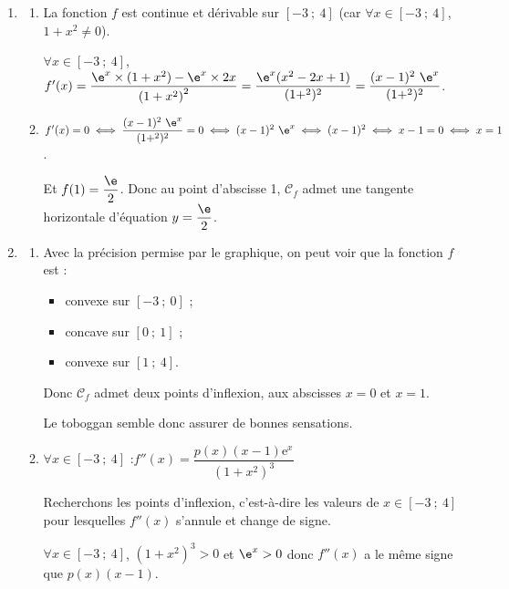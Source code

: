 \begin{enumerate}
	\item 
	\begin{enumerate}
		\item La fonction $f$ est continue et dérivable sur $[-3~;~4]$ (car $\forall x \in [-3~;~4]$, $1+x^2\neq 0$).
		
		$\forall x \in [-3~;~4]$, $f'(x)=\dfrac{\e^x\times (1+x^2)-\e^x\times 2x}{\left(1+x^2\right)^2}=\dfrac{\e^x(x^2-2x+1)}{(1+^2)^2}=\dfrac{(x-1)^2~\e^x}{(1+^2)^2}$.
		\item $f'(x)=0\iff \dfrac{(x-1)^2~\e^x}{(1+^2)^2}=0 \iff (x-1)^2~\e^x \iff (x-1)^2 \iff x-1=0 \iff x=1$.
		
		Et $f(1)=\dfrac{\e}{2}$. Donc au point d'abscisse 1, $\mathcal{C}_f$ admet une tangente horizontale d'équation $y=\dfrac{\e}{2}$.
	\end{enumerate}
	\item
		\begin{enumerate}
			\item Avec la précision permise par le graphique, on peut voir que la fonction $f$ est :
				\begin{itemize}
					\item convexe sur $[-3~;~0]$ ;
					\item concave sur $[0~;~1]$ ;
					\item convexe sur $[1~;~4]$.
				\end{itemize}
		Donc $\mathcal{C}_f$ admet deux points d'inflexion, aux abscisses $x=0$ et $x=1$.
	
		Le toboggan semble donc assurer de bonnes sensations.
			\item $\forall x \in [-3~;~4]$ :\:$f''(x) = \dfrac{p(x)(x - 1)\text{e}^x}{\left(1 + x^2\right)^3}$
			
			Recherchons les points d'inflexion, c'est-à-dire les valeurs de $x\in [-3~;~4]$ pour lesquelles $f''(x)$ s'annule et change de signe.
			
			$\forall x \in [-3~;~4]$, $\left(1 + x^2\right)^3>0$ et $\e^x>0$ donc $f''(x)$ a le même signe que $p(x)(x - 1)$.
			

\end{enumerate}
\end{enumerate}
